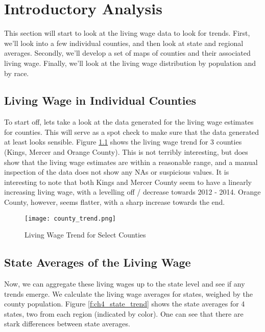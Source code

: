 \chapter{Introductory Analysis}\label{ch:intro_analysis}

This section will start to look at the living wage data to look for trends. First, we'll look into a few individual counties, and then look at state and regional averages. Secondly, we'll develop a set of maps of counties and their associated living wage. Finally, we'll look at the living wage distribution by population and by race.

\section{Living Wage in Individual Counties}

To start off, lets take a look at the data generated for the living wage estimates for counties. This will serve as a spot check to make sure that the data generated at least looks sensible. Figure \ref{f:ch4_individual} shows the living wage trend for 3 counties (Kings, Mercer and Orange County). This is not terribly interesting, but does show that the living wage estimates are within a reasonable range, and a manual inspection of the data does not show any NAs or suspicious values. It is interesting to note that both Kings and Mercer County seem to have a linearly increasing living wage, with a levelling off / decrease towards 2012 - 2014. Orange County, however, seems flatter, with a sharp increase towards the end.

\begin{figure}[H]
    \centering
        \texttt{[image: county\_trend.png]}
        \caption{Living Wage Trend for Select Counties}
    \label{f:ch4_individual}
\end{figure}


\section{State Averages of the Living Wage}

Now, we can aggregate these living wages up to the state level and see if any trends emerge. We calculate the living wage averages for states, weighed by the county population. Figure \ref{f:ch4_state_trend} shows the state averages for 4 states, two from each region (indicated by color). One can see that there are stark differences between state averages.

